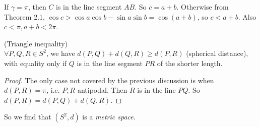 \documentclass[a4paper]{article}
\begin{document}
If $\gamma = \pi$, then $C$ is in the line segment $AB$. So $c=a+b$. Otherwise from Theorem 2.1, $\cos c > \cos a \cos b - \sin a\sin b = \cos(a+b)$, so $c<a+b$. Also $c<\pi,a+b<2\pi$.

\begin{coro} (Triangle inequality)\\
$\forall P,Q,R \in S^2$, we have $d(P,Q)+d(Q,R) \geq d(P,R)$ (spherical distance), with equality only if $Q$ is in the line segment $PR$ of the shorter length.
\begin{proof}
The only case not covered by the previous discussion is when $d(P,R) = \pi$, i.e. $P,R$ antipodal. Then $R$ is in the line $PQ$. So $d(P,R)=d(P,Q)+d(Q,R)$.
\end{proof}
\end{coro}

So we find that $(S^2,d)$ is a \emph{metric space}.
\end{document}
